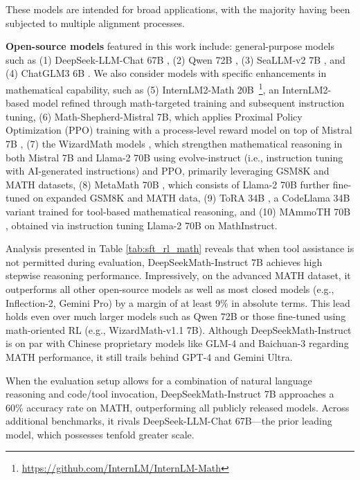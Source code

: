 These models are intended for broad applications, with the majority having been subjected to multiple alignment processes.

\item \textbf{Open-source models} featured in this work include: general-purpose models such as (1) DeepSeek-LLM-Chat 67B \citep{deepseek-llm}, (2) Qwen 72B \citep{qwen}, (3) SeaLLM-v2 7B \citep{seallm}, and (4) ChatGLM3 6B \citep{chatglm3}. We also consider models with specific enhancements in mathematical capability, such as (5) InternLM2-Math 20B~\footnote{\url{https://github.com/InternLM/InternLM-Math}}, an InternLM2-based model refined through math-targeted training and subsequent instruction tuning, (6) Math-Shepherd-Mistral 7B, which applies Proximal Policy Optimization (PPO) training \citep{schulman2017proximal} with a process-level reward model on top of Mistral 7B \citep{mistral}, (7) the WizardMath models \citep{wizardmath}, which strengthen mathematical reasoning in both Mistral 7B and Llama-2 70B \citep{llama2} using evolve-instruct (i.e., instruction tuning with AI-generated instructions) and PPO, primarily leveraging GSM8K and MATH datasets, (8) MetaMath 70B \citep{metamath}, which consists of Llama-2 70B further fine-tuned on expanded GSM8K and MATH data, (9) ToRA 34B \cite{tora}, a CodeLlama 34B variant trained for tool-based mathematical reasoning, and (10) MAmmoTH 70B \citep{MathInstruct}, obtained via instruction tuning Llama-2 70B on MathInstruct.

Analysis presented in Table \ref{tab:sft_rl_math} reveals that when tool assistance is not permitted during evaluation, DeepSeekMath-Instruct 7B achieves high stepwise reasoning performance. Impressively, on the advanced MATH dataset, it outperforms all other open-source models as well as most closed models (e.g., Inflection-2, Gemini Pro) by a margin of at least 9\% in absolute terms. This lead holds even over much larger models such as Qwen 72B or those fine-tuned using math-oriented RL (e.g., WizardMath-v1.1 7B). Although DeepSeekMath-Instruct is on par with Chinese proprietary models like GLM-4 and Baichuan-3 regarding MATH performance, it still trails behind GPT-4 and Gemini Ultra.

When the evaluation setup allows for a combination of natural language reasoning and code/tool invocation, DeepSeekMath-Instruct 7B approaches a 60\% accuracy rate on MATH, outperforming all publicly released models. Across additional benchmarks, it rivals DeepSeek-LLM-Chat 67B—the prior leading model, which possesses tenfold greater scale.

